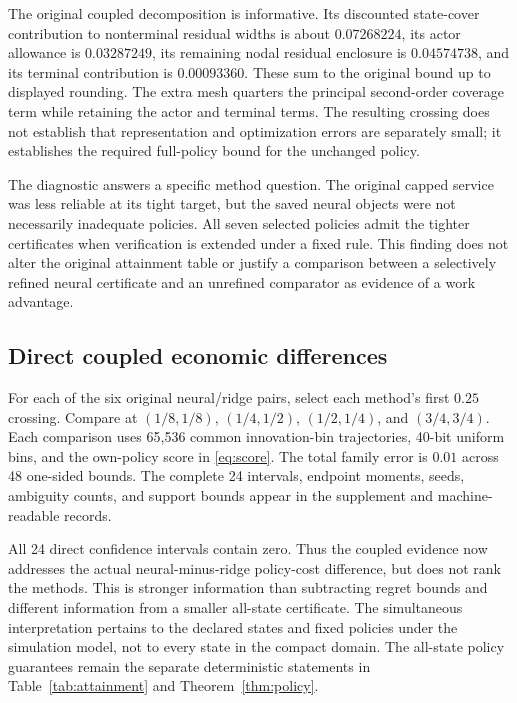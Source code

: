 \documentclass[ecta,nameyear,draft]{econsocart}
\begin{document}
The original coupled decomposition is informative. Its discounted state-cover contribution to nonterminal residual widths is about $0.07268224$, its actor allowance is $0.03287249$, its remaining nodal residual enclosure is $0.04574738$, and its terminal contribution is $0.00093360$. These sum to the original bound up to displayed rounding. The extra mesh quarters the principal second-order coverage term while retaining the actor and terminal terms. The resulting crossing does not establish that representation and optimization errors are separately small; it establishes the required full-policy bound for the unchanged policy.

The diagnostic answers a specific method question. The original capped service was less reliable at its tight target, but the saved neural objects were not necessarily inadequate policies. All seven selected policies admit the tighter certificates when verification is extended under a fixed rule. This finding does not alter the original attainment table or justify a comparison between a selectively refined neural certificate and an unrefined comparator as evidence of a work advantage.

\subsection{Direct coupled economic differences}

For each of the six original neural/ridge pairs, select each method's first $0.25$ crossing. Compare at $(1/8,1/8)$, $(1/4,1/2)$, $(1/2,1/4)$, and $(3/4,3/4)$. Each comparison uses 65,536 common innovation-bin trajectories, 40-bit uniform bins, and the own-policy score in \eqref{eq:score}. The total family error is $0.01$ across 48 one-sided bounds. The complete 24 intervals, endpoint moments, seeds, ambiguity counts, and support bounds appear in the supplement and machine-readable records.

All 24 direct confidence intervals contain zero. Thus the coupled evidence now addresses the actual neural-minus-ridge policy-cost difference, but does not rank the methods. This is stronger information than subtracting regret bounds and different information from a smaller all-state certificate. The simultaneous interpretation pertains to the declared states and fixed policies under the simulation model, not to every state in the compact domain. The all-state policy guarantees remain the separate deterministic statements in Table~\ref{tab:attainment} and Theorem~\ref{thm:policy}.
\end{document}
